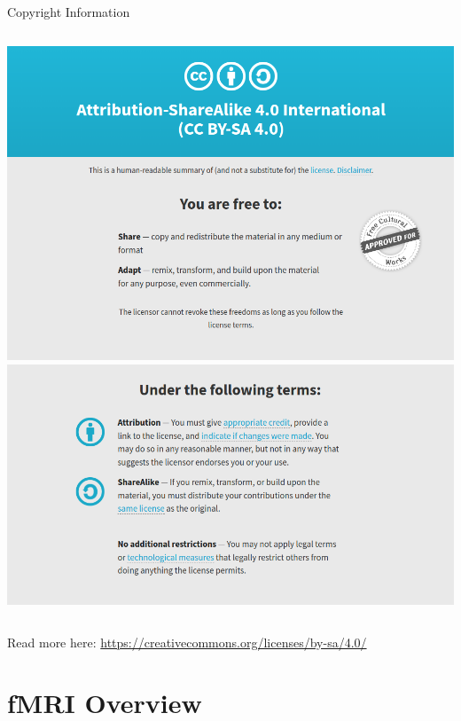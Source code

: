 \documentclass[aspectratio=169,xcolor=dvipsnames]{beamer}
\begin{document}

\begin{frame}{Copyright Information}

\begin{columns}[c]
\includegraphics[width=1\textwidth]{imgs/cc}
\includegraphics[width=1\textwidth]{imgs/cc2}
\end{columns}

\vspace{.5cm}
Read more here: \url{https://creativecommons.org/licenses/by-sa/4.0/}

\end{frame}

\section{fMRI Overview}
\end{document}
